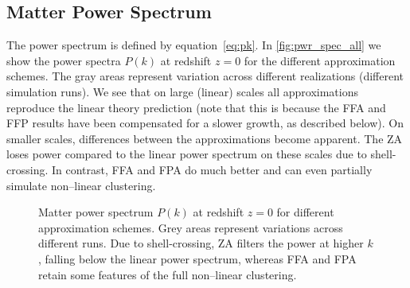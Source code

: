 \subsection{Matter Power Spectrum}
\label{sec:pwr_spec}
The power spectrum is defined by equation~\eqref{eq:pk}. In \autoref{fig:pwr_spec_all} we show the power spectra $P(k)$ at redshift $z=0$ for the different approximation schemes. The gray areas represent variation across different realizations (different simulation runs). We see that on large (linear) scales all approximations reproduce the linear theory prediction (note that this is because the FFA and FFP results have been compensated for a slower growth, as described below). On smaller scales, differences between the approximations become apparent. The ZA loses power compared to the linear power spectrum on these scales due to shell-crossing. In contrast, FFA and FPA do much better and can even partially simulate non--linear clustering.

\begin{figure}[hbt]
\centering
	\begin{subfigure}{0.9\textwidth}
	\end{subfigure}
	\begin{subfigure}{0.9\textwidth}
	\end{subfigure}%
    \caption{Matter power spectrum $P(k)$ at redshift $z=0$ for different approximation schemes. Grey areas represent variations across different runs. Due to shell-crossing, ZA filters the power at higher $k$, falling below the linear power spectrum, whereas FFA and FPA retain some features of the full non--linear clustering.}
    \label{fig:pwr_spec_all}
\end{figure}

